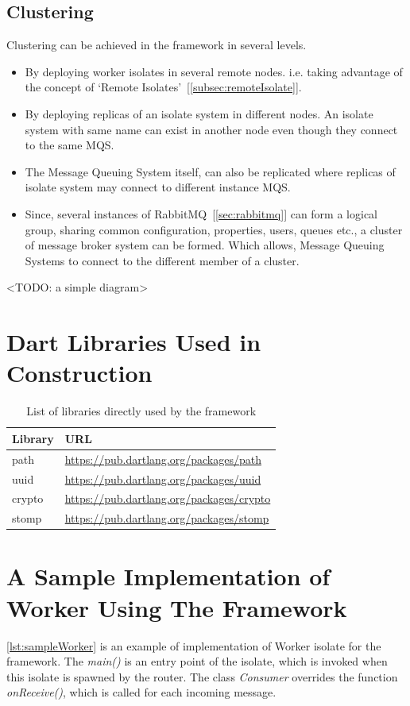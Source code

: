 \subsection{Clustering}
  Clustering can be achieved in the framework in several levels.
  \begin{itemize}
  \item By deploying worker isolates in several remote nodes. i.e. taking advantage of the concept of ‘Remote Isolates’~[\autoref{subsec:remoteIsolate}].
  \item By deploying replicas of an isolate system in different nodes. An isolate system with same name can exist in another node even though they connect to the same MQS.
  \item The Message Queuing System itself, can also be replicated where replicas of isolate system may connect to different instance MQS.
  \item Since, several instances of RabbitMQ~[\autoref{sec:rabbitmq}] can form a logical group, sharing common configuration, properties, users, queues etc., a cluster of message broker system can be formed. Which allows, Message Queuing Systems to connect to the different member of a cluster.
  \end{itemize}
<TODO: a simple diagram>
\section{Dart Libraries Used in Construction}
\begin{table}[htsb]
  \caption[Dependent libraries of the framework]{List of libraries directly used by the framework}\label{tab:libraries}
  \centering
  \begin{tabular}{l l}
    \toprule
      Library & URL \\
    \midrule
      path &  \url{https://pub.dartlang.org/packages/path}\\
      uuid &  \url{https://pub.dartlang.org/packages/uuid}\\
      crypto &  \url{https://pub.dartlang.org/packages/crypto}\\
      stomp &  \url{https://pub.dartlang.org/packages/stomp}\\
    \bottomrule
  \end{tabular}
\end{table}

\section{A Sample Implementation of Worker Using The Framework}
\autoref{lst:sampleWorker} is an example of implementation of Worker isolate for the framework. The \emph{main()} is an entry point of the isolate, which is invoked when this isolate is spawned by the router. The class \emph{Consumer} overrides the function \emph{onReceive()}, which is called for each incoming message.

